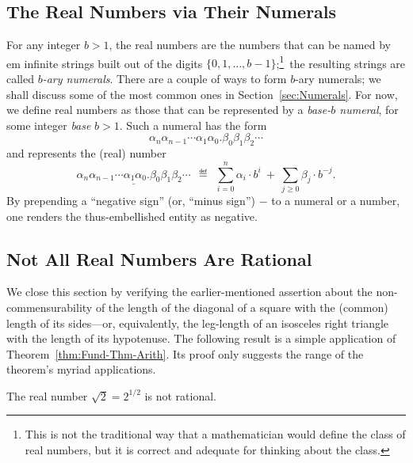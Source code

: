 \subsection{The Real Numbers via Their Numerals}
\label{sec:define-Reals}

For any integer $b > 1$, the real numbers are the numbers that can be
named by {em infinite} strings built out of the digits $\{0, 1,
\ldots, b-1\}$;\footnote{This is not the traditional way that a
  mathematician would define the class of real numbers, but it is
  correct and adequate for thinking about the class.}~the resulting
strings are called {\em $b$-ary numerals}.  There are a couple of ways
to form $b$-ary numerals; we shall discuss some of the most common
ones in Section~\ref{sec:Numerals}.  For now, we define real numbers
as those that can be represented by a {\it base-$b$ numeral},
for some integer {\it base} $b >1$.
Such a numeral has the form
\[
\alpha_n \alpha_{n-1} \cdots \alpha_1 \alpha_0                  
. \beta_0 \beta_1 \beta_2 \cdots
\]
and represents the (real) number
\[
\underline{\alpha_n \alpha_{n-1} \cdots \alpha_1 \alpha_0                  
. \beta_0 \beta_1 \beta_2 \cdots}
\ \ \eqdef \ \
\sum_{i=0}^n \alpha_i \cdot b^i
\ + \ \sum_{j\geq 0} \beta_j \cdot b^{-j}.
\]
By prepending a ``negative sign'' (or, ``minus sign'') $-$ to a
numeral or a number, one renders the thus-embellished entity as
negative.


\subsection{Not All Real Numbers Are Rational}
\label{sec:Real-vs-Rational}

We close this section by verifying the earlier-mentioned assertion
about the non-commensurability of the length of the diagonal of a
square with the (common) length of its sides---or, equivalently, the
leg-length of an isosceles right triangle with the length of its
hypotenuse.
%
The following result is a simple application of
Theorem~\ref{thm:Fund-Thm-Arith}.  Its proof only suggests the range
of the theorem's myriad applications.


\begin{prop}
\label{thm:sqrt(2)}
The real number $\sqrt{2} = 2^{1/2}$ is not rational.
\end{prop}

